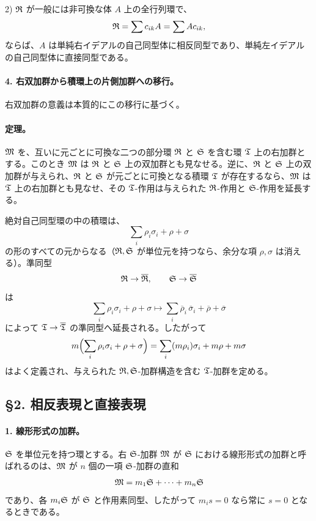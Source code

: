2) \(\mathfrak R\) が一般には非可換な体 \(A\) 上の全行列環で、
\[
        \mathfrak R=\sum c_{ik}A=\sum A c_{ik},
\]
ならば、\(A\) は単純右イデアルの自己同型体に相反同型であり、単純左イデアルの自己同型体に直接同型である。

\paragraph{4. 右双加群から積環上の片側加群への移行。}
右双加群の意義は本質的にこの移行に基づく。

\paragraph{定理。}
\(\mathfrak M\) を、互いに元ごとに可換な二つの部分環 \(\mathfrak R\) と \(\mathfrak S\) を含む環 \(\mathfrak T\) 上の右加群とする。このとき \(\mathfrak M\) は \(\mathfrak R\) と \(\mathfrak S\) 上の双加群とも見なせる。逆に、\(\mathfrak R\) と \(\mathfrak S\) 上の双加群が与えられ、\(\mathfrak R\) と \(\mathfrak S\) が元ごとに可換となる積環 \(\mathfrak T\) が存在するなら、\(\mathfrak M\) は \(\mathfrak T\) 上の右加群とも見なせ、その \(\mathfrak T\)-作用は与えられた \(\mathfrak R\)-作用と \(\mathfrak S\)-作用を延長する。

絶対自己同型環の中の積環は、
\[
        \sum_i \rho_i\sigma_i+\rho+\sigma
\]
の形のすべての元からなる（\(\mathfrak R,\mathfrak S\) が単位元を持つなら、余分な項 \(\rho,\sigma\) は消える）。準同型
\[
        \mathfrak R\to\overline{\mathfrak R},\qquad
        \mathfrak S\to\overline{\mathfrak S}
\]
は
\[
        \sum_i \rho_i\sigma_i+\rho+\sigma
        \longmapsto
        \sum_i \overline\rho_i\,\overline\sigma_i+\overline\rho+\overline\sigma
\]
によって \(\mathfrak T\to\overline{\mathfrak T}\) の準同型へ延長される。したがって
\[
        m\Bigl(\sum_i \rho_i\sigma_i+\rho+\sigma\Bigr)
        =\sum_i (m\rho_i)\sigma_i+m\rho+m\sigma
\]
はよく定義され、与えられた \(\mathfrak R,\mathfrak S\)-加群構造を含む \(\mathfrak T\)-加群を定める。

\subsection*{§2. 相反表現と直接表現}

\paragraph{1. 線形形式の加群。}
\(\mathfrak S\) を単位元を持つ環とする。右 \(\mathfrak S\)-加群 \(\mathfrak M\) が \(\mathfrak S\) における線形形式の加群と呼ばれるのは、\(\mathfrak M\) が \(n\) 個の一項 \(\mathfrak S\)-加群の直和
\[
        \mathfrak M=m_1\mathfrak S+\cdots+m_n\mathfrak S
\]
であり、各 \(m_i\mathfrak S\) が \(\mathfrak S\) と作用素同型、したがって \(m_i s=0\) なら常に \(s=0\) となるときである。

